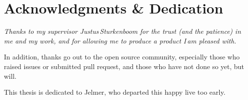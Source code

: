 
\begingroup
  \let\clearpage\relax
  \let\cleardoublepage\relax
  \chapter*{Acknowledgments \& Dedication}

  \itshape
  Thanks to my supervisor Justus\,Sturkenboom for the trust (and the patience)
    in me and my work, and for allowing me to produce a product I\,am pleased
    with.

  \medskip
  \noindent In addition, thanks go out to the open source community,
    especially those who raised issues or submitted pull request, and those
    who have not done so yet, but will.

  \medskip
  \noindent This thesis is dedicated to Jelmer, who departed this happy live
    too early.
\endgroup
